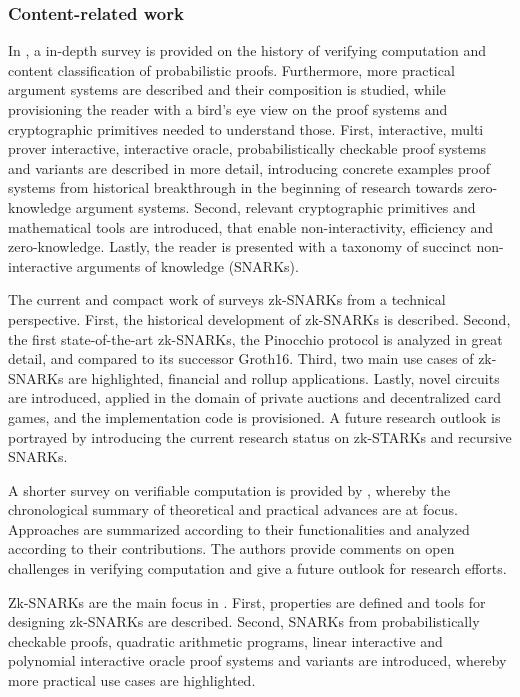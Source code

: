 \subsubsection{Content-related work}
In \citet{Thaler}, a in-depth survey is provided on the history of verifying computation and content classification of probabilistic proofs. Furthermore, more practical argument systems are described and their composition is studied, while provisioning the reader with a bird's eye view on the proof systems and cryptographic primitives needed to understand those. First, interactive, multi prover interactive, interactive oracle, probabilistically checkable proof systems and variants are described in more detail, introducing concrete examples proof systems from historical breakthrough in the beginning of research towards zero-knowledge argument systems. Second, relevant cryptographic primitives and mathematical tools are introduced, that enable non-interactivity, efficiency and zero-knowledge. Lastly, the reader is presented with a taxonomy of succinct non-interactive arguments of knowledge (SNARKs).

The current and compact work of \citet{chen2022review} surveys zk-SNARKs from a technical perspective. First, the historical development of zk-SNARKs is described. Second, the first state-of-the-art zk-SNARKs, the Pinocchio protocol is analyzed in great detail, and compared to its successor Groth16. Third, two main use cases of zk-SNARKs are highlighted, financial and rollup applications. Lastly, novel circuits are introduced, applied in the domain of private auctions and decentralized card games, and the implementation code is provisioned. A future research outlook is portrayed by introducing the current research status on zk-STARKs and recursive SNARKs.

A shorter survey on verifiable computation is provided by \citet{Ahmad}, whereby the chronological summary of theoretical and practical advances are at focus. Approaches are summarized according to their functionalities and analyzed according to their contributions. The authors provide comments on open challenges in verifying computation and give a future outlook for research efforts. 

Zk-SNARKs are the main focus in \citet{NitulescuGentleIntroSNARKs}. First, properties are defined and tools for designing zk-SNARKs are described. Second, SNARKs from probabilistically checkable proofs, quadratic arithmetic programs, linear interactive and polynomial interactive oracle proof systems and variants are introduced, whereby more practical use cases are highlighted. 

